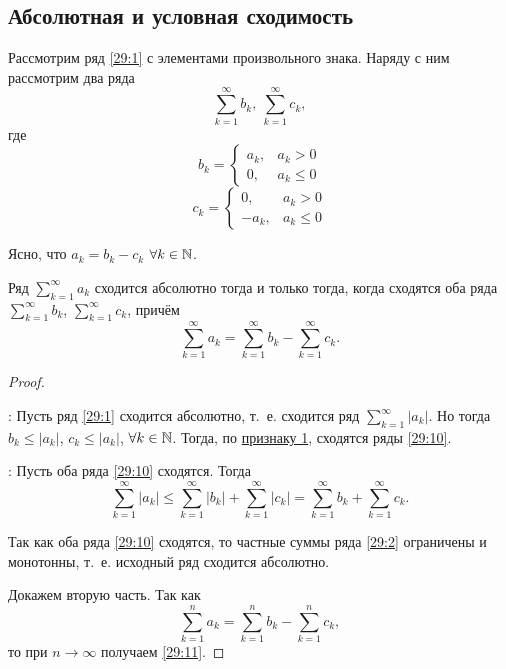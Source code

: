 \documentclass[../../main.tex]{subfiles}
\begin{document}
	\subsection{Абсолютная и условная сходимость}
	
	Рассмотрим ряд \eqref{29:1} с элементами произвольного знака. Наряду с ним 
	рассмотрим два ряда 
	\begin{equation}
		\sum\limits_{k = 1}^\infty b_k,\ \sum\limits_{k = 1}^\infty c_k,
		\label{29:10}
	\end{equation} 
	где
	\[b_k = \begin{cases}
		a_k,& a_{k} > 0\\
		0,& a_{k}\leq0
	\end{cases}\]
	\[c_k = \begin{cases}
		0,& a_{k} > 0\\
		-a_k,& a_{k}\leq 0
	\end{cases}\]
	
	Ясно, что $a_k = b_k - c_k$ $\forall k\in\mathbb{N}$.
	
	\begin{thm}\label{29:absolute_conv}
		Ряд $\sum\limits_{k = 1}^\infty a_k$ сходится абсолютно 
		тогда и только тогда, когда сходятся оба ряда 
		$\sum\limits_{k = 1}^\infty b_k$, $\sum\limits_{k = 1}^\infty c_k$, 
		причём
		\begin{equation}
			\sum_{k = 1}^\infty a_k = \sum_{k = 1}^\infty b_k - \sum_{k = 1}^\infty c_k.
			\label{29:11}
		\end{equation}
	\end{thm}
	\begin{proof}
		~
		
		\nec: Пусть ряд \eqref{29:1} сходится 
		абсолютно, т.~е. сходится ряд $\sum\limits_{k = 1}^\infty |a_k|$.
		Но тогда $b_k\leq |a_k|$, $c_k\leq |a_k|$, $\forall k\in\mathbb{N}$. 
		Тогда, по \hyperref[lec26:comp_test_1]{признаку 1\textdegree}, 
		сходятся ряды \eqref{29:10}.
		
		\suff: Пусть оба ряда \eqref{29:10} сходятся. 
		Тогда
		\[\sum_{k = 1}^\infty |a_k|\leq \sum_{k = 1}^\infty |b_k| + 
		\sum_{k = 1}^\infty|c_k| = \sum_{k = 1}^\infty b_k + 
		\sum_{k = 1}^\infty c_k.\]
		
		Так как оба ряда \eqref{29:10} сходятся, 
		то частные суммы ряда \eqref{29:2} ограничены и монотонны, т.~е. исходный 
		ряд сходится абсолютно.
		
		Докажем вторую часть. Так как 
		\[\sum_{k = 1}^n a_k = \sum_{k = 1}^n b_k - \sum_{k = 1}^n c_k,\]
		то при $n\to\infty$ получаем \eqref{29:11}.
	\end{proof}
\end{document}
